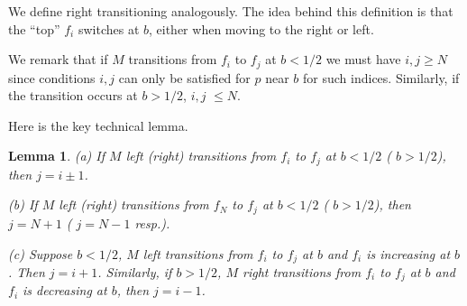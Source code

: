 \documentclass{amsart}
\newtheorem{lemma}[theorem]{Lemma}
\theoremstyle{plain}
\numberwithin{equation}{section}
\begin{document}
\smallskip

We define right transitioning analogously.
The idea behind this definition is that the ``top'' $f_i$ switches at $b$, either when moving to the right or left.

We remark that if $M$ transitions from $f_{i}$ to $f_{j}$ at $b<1/2$ we must
have $i,j\geq N$ since conditions $i,j$ can only be satisfied for $p$ near $b
$ for such indices. Similarly, if the transition occurs at $b>1/2$, $i,j$ $%
\leq N$.

Here is the key technical lemma.

\begin{lemma}
\label{transition}(a) If $M$ left (right) transitions from $f_{i}$ to $f_{j}$
at $b<1/2$ ( $b>1/2$), then $j=i\pm 1$.

(b) If $M$ left (right) transitions from $f_{N}$ to $f_{j}$ at $b<1/2$ ( $%
b>1/2$), then $j=N+1$ ( $j=N-1$ resp.).

(c) Suppose $b<1/2$, $M$ left transitions from $f_{i}$ to $f_{j}$ at $b$ and 
$f_{i}$ is increasing at $b$. Then $j=i+1$. Similarly, if $b>1/2$, $M$ right
transitions from $f_{i}$ to $f_{j}$ at $b$ and $f_{i}$ is decreasing at $b$,
then $j=i-1$.
\end{lemma}
\end{document}
